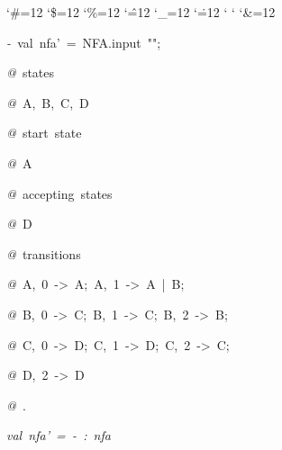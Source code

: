 \begin{list}{}
{\setlength{\leftmargin}{\leftmargini}
\setlength{\rightmargin}{0cm}
\setlength{\itemindent}{0cm}
\setlength{\listparindent}{0cm}
\setlength{\itemsep}{0cm}
\setlength{\parsep}{0cm}
\setlength{\labelsep}{0cm}
\setlength{\labelwidth}{0cm}
\catcode`\#=12
\catcode`\$=12
\catcode`\%=12
\catcode`\^=12
\catcode`\_=12
\catcode`\.=12
\catcode`
\catcode`
\catcode`\&=12
\ttfamily}
\small
\item[]\textsl{-\ }val\ nfa'\ =\ NFA.input\ "";
\item[]\textsl{@\ }states
\item[]\textsl{@\ }A,\ B,\ C,\ D
\item[]\textsl{@\ }start\ state
\item[]\textsl{@\ }A
\item[]\textsl{@\ }accepting\ states
\item[]\textsl{@\ }D
\item[]\textsl{@\ }transitions
\item[]\textsl{@\ }A,\ 0\ ->\ A;\ A,\ 1\ ->\ A\ |\ B;
\item[]\textsl{@\ }B,\ 0\ ->\ C;\ B,\ 1\ ->\ C;\ B,\ 2\ ->\ B;
\item[]\textsl{@\ }C,\ 0\ ->\ D;\ C,\ 1\ ->\ D;\ C,\ 2\ ->\ C;
\item[]\textsl{@\ }D,\ 2\ ->\ D
\item[]\textsl{@\ }.
\item[]\textsl{val\ nfa'\ =\ -\ :\ nfa}
\end{list}
